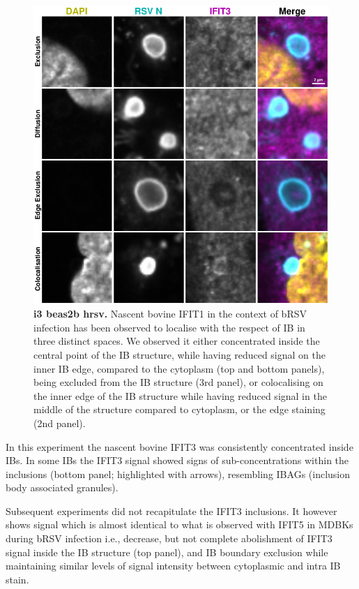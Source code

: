 \begin{figure}
    \centering
    \includegraphics[width=1\linewidth]{09. Chapter 4/Figs/02. Infection/02. IFIT3/06. beas2b i3.pdf}
    \caption[i3 beas2b hrsv]{\textbf{i3 beas2b hrsv.} Nascent bovine IFIT1 in the context of bRSV infection has been observed to localise with the respect of IB in three distinct spaces. We observed it either concentrated inside the central point of the IB structure, while having reduced signal on the inner IB edge, compared to the cytoplasm (top and bottom panels), being excluded from the IB structure (3rd panel), or colocalising on the inner edge of the IB structure while having reduced signal in the middle of the structure compared to cytoplasm, or the edge staining (2nd panel).}
    \label{fig:i3 beas2b hrsv}
\end{figure}

In this experiment the nascent bovine IFIT3 was consistently concentrated inside IBs. In some IBs the IFIT3 signal showed signs of sub-concentrations within the inclusions (bottom panel; highlighted with arrows), resembling IBAGs (inclusion body associated granules).

Subsequent experiments did not recapitulate the IFIT3 inclusions. It however shows signal which is almost identical to what is observed with IFIT5 in MDBKs during bRSV infection i.e., decrease, but not complete abolishment of IFIT3 signal inside the IB structure (top panel), and IB boundary exclusion while maintaining similar levels of signal intensity between cytoplasmic and intra IB stain.

